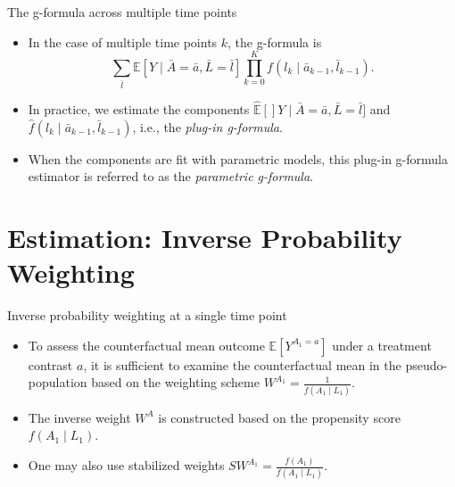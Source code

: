\documentclass[ignorenonframetext,]{beamer}
\providecommand{\tightlist}{%
  \setlength{\itemsep}{0pt}\setlength{\parskip}{0pt}}
\newcommand{\E}{\mathbb{E}}
\begin{document}
\begin{frame}{The g-formula across multiple time points}
\protect\hypertarget{the-g-formula-across-multiple-time-points-1}{}

\begin{itemize}[<+->]
\tightlist
\item
  In the case of multiple time points \(k\), the g-formula is
  \[\sum_{\bar{l}} \E[Y \mid \bar{A} = \bar{a}, \bar{L} = \bar{l}]
    \prod_{k=0}^{K} f(l_k \mid \bar{a}_{k-1}, \bar{l}_{k-1}).\]
\item
  In practice, we estimate the components
  \(\hat{\E}[]Y \mid \bar{A} = \bar{a}, \bar{L} = \bar{l}]\) and
  \(\hat{f}(l_k \mid \bar{a}_{k-1}, \bar{l}_{k-1})\), i.e., the
  \emph{plug-in g-formula}.
\item
  When the components are fit with parametric models, this plug-in
  g-formula estimator is referred to as the \emph{parametric g-formula}.
\end{itemize}

\end{frame}

\hypertarget{estimation-inverse-probability-weighting}{%
\section{Estimation: Inverse Probability
Weighting}\label{estimation-inverse-probability-weighting}}

\begin{frame}{Inverse probability weighting at a single time point}
\protect\hypertarget{inverse-probability-weighting-at-a-single-time-point}{}

\begin{itemize}[<+->]
\tightlist
\item
  To assess the counterfactual mean outcome \(\E[Y^{A_1 = a}]\) under a
  treatment contrast \(a\), it is sufficient to examine the
  counterfactual mean in the pseudo-population based on the weighting
  scheme \(W^{A_1} = \frac{1}{f(A_1 \mid L_1)}\).
\item
  The inverse weight \(W^A\) is constructed based on the propensity
  score \(f(A_1 \mid L_1)\).
\item
  One may also use stabilized weights
  \(SW^{A_1} = \frac{f(A_1)}{f(A_1 \mid L_1)}\).
\end{itemize}

\end{frame}
\end{document}
